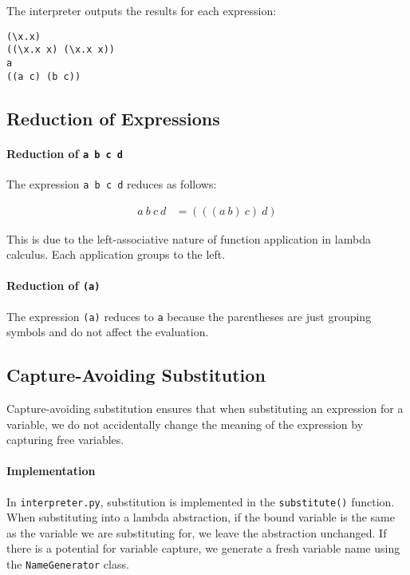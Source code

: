 \documentclass{article}
\theoremstyle{theorem}
\theoremstyle{definition}
\theoremstyle{remark}
\begin{document}
The interpreter outputs the results for each expression:

\begin{verbatim}
(\x.x)
((\x.x x) (\x.x x))
a
((a c) (b c))
\end{verbatim}

\subsection{Reduction of Expressions}

\paragraph{Reduction of \texttt{a b c d}}

The expression \texttt{a b c d} reduces as follows:

\begin{align*}
a\ b\ c\ d &= (((a\ b)\ c)\ d)
\end{align*}

This is due to the left-associative nature of function application in lambda calculus. Each application groups to the left.

\paragraph{Reduction of \texttt{(a)}}

The expression \texttt{(a)} reduces to \texttt{a} because the parentheses are just grouping symbols and do not affect the evaluation.

\subsection{Capture-Avoiding Substitution}

Capture-avoiding substitution ensures that when substituting an expression for a variable, we do not accidentally change the meaning of the expression by capturing free variables.

\paragraph{Implementation}

In \texttt{interpreter.py}, substitution is implemented in the \texttt{substitute()} function. When substituting into a lambda abstraction, if the bound variable is the same as the variable we are substituting for, we leave the abstraction unchanged. If there is a potential for variable capture, we generate a fresh variable name using the \texttt{NameGenerator} class.
\end{document}
